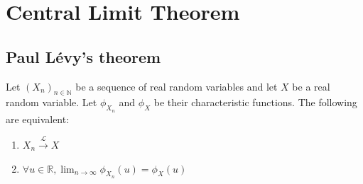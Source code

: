 \chapter{Central Limit Theorem}%
\sloppy%
\section{Paul Lévy's theorem}%
\begin{theorem}
Let $(X_n)_{n \in \mathbb{N}}$ be a sequence of real random variables and let $X$ be a real random variable. Let $\phi_{X_n}$ and $\phi_X$ be their characteristic functions. The following are equivalent:
\begin{enumerate}
    \item[i)] $X_n \xrightarrow{\mathcal{L}} X$
    \item[ii)] $\forall u \in \mathbb{R}, \lim_{n \to \infty} \phi_{X_n}(u) = \phi_X(u)$
\end{enumerate}
\end{theorem}%
